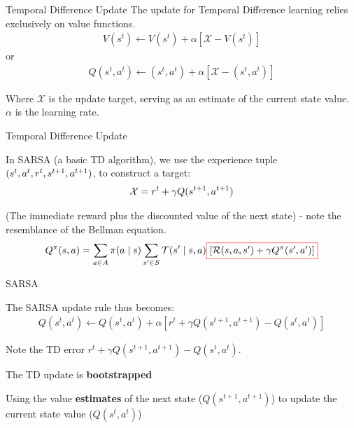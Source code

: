 \begin{frame}{Temporal Difference Update}
    The update for Temporal Difference learning relies exclusively on value functions.
    \vspace{0pt}
    \begin{align*}
        V(s^{t}) \gets V(s^{t}) + \alpha \left[\mathcal{X} - V(s^{t})\right]
    \end{align*}
    or 
    \vspace{0pt}
    \begin{align*}
        Q(s^{t}, a^{t}) \gets (s^{t}, a^{t})  + \alpha \left[\mathcal{X} - (s^{t}, a^{t})\right]
    \end{align*}

    Where $\mathcal{X}$ is the update target, serving as an estimate of the current state value. $\alpha$ is the learning rate. 
    
\end{frame}

\begin{frame}{Temporal Difference Update}
    
    In SARSA (a basic TD algorithm), we use the experience tuple $(s^{t}, a^{t}, r^{t}, s^{t+1}, a^{t+1})$, to construct a target:
    \vspace{10pt}
    \begin{align*}
        \mathcal{X} = r^t + \gamma Q(s^{t+1}, a^{t+1})
    \end{align*}
    
    (The immediate reward plus the discounted value of the next state) - note the resemblance of the Bellman equation. 
    \vspace{10pt}
    \begin{align*}
        Q^{\pi}(\st, \ac) = \sum_{\ac \in \Ac} \pi(\ac \mid \st) \sum_{\st' \in \St} \Stf(\st' \mid \st, \ac) \Cboxed{red}{$\left[\Rew(\st, \ac, \st') + \gamma Q^{\pi}(s', a')\right]$}
    \end{align*}
\end{frame}

\begin{frame}{SARSA}
    
The SARSA update rule thus becomes:
\vspace{0pt}
\begin{align*}
  Q(s^t, a^t) \leftarrow Q(s^t, a^t) + \alpha[r^t + \gamma Q(s^{t+1}, a^{t+1})- Q(s^t,a^t)] 
\end{align*}

\blist
    \item Note the TD error $r^t + \gamma Q(s^{t+1}, a^{t+1})- Q(s^t,a^t)$.
    \item The TD update is \textbf{bootstrapped}
    \item Using the value \textbf{estimates} of the next state ($Q(s^{t+1}, a^{t+1})$) to update the current state value ($Q(s^t,a^t)$)
\elist



\end{frame}

